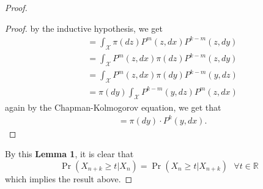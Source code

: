 \begin{theorem}
\begin{proof}
\begin{lem}
\begin{proof}
                by the inductive hypothesis, we get
                \begin{align*}
                    &= \int_{\mathcal{X}} \pi(dz) P^m(z, dx) P^{k-m}(z, dy) \\
                    &= \int_{\mathcal{X}} P^m(z, dx) \pi(dz) P^{k-m}(z, dy) \\
                    &= \int_{\mathcal{X}} P^m(z, dx) \pi(dy) P^{k-m}(y, dz) \\
                    &= \pi(dy) \int_{\mathcal{X}}  P^{k-m}(y, dz) P^m(z, dx)
                \end{align*}
                again by the Chapman-Kolmogorov equation, we get that
                \begin{align*}
                    &= \pi(dy) \cdot P^k(y, dx).
                \end{align*}
            \end{proof}
        \end{lem}
        By this \textbf{Lemma 1}, it is clear that
        \begin{equation*}
            \Pr (X_{n+k} \geq t | X_n) = \Pr (X_n \geq t | X_{n+k}) \text{  } \forall t \in \mathbb{R}
        \end{equation*}
        which implies the result above.
    \end{proof}
\end{theorem}

\newpage

